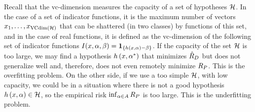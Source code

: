 Recall that the \acrshort{vc}-dimension measures the capacity of a set of hypotheses $\mathcal{H}$. 
In the case of a set of indicator functions, it is the maximum number of vectors $x_1, \ldots, x_{\operatorname{VCdim}\left(\mathcal{H}\right)}$ that can be shattered (in two classes) by functions of this set, and in the case of real functions, it is defined as the \acrshort{vc}-dimension of the following set of indicator functions $ I(x, \alpha, \beta) = \bm{1}_{\{h\left(x, \alpha\right) - \beta\}} $.
If the capacity of the set $\mathcal{H}$ is too large, we may find a
hypothesis $h\left(x, {\alpha}^*\right)$ that minimizes $\hat{R}_{D}$ but does not 
generalize well and, therefore, does not even remotely minimize $R_P$. This is the 
overfitting problem. 
On the other side, if we use a too simple $\mathcal{H}$, 
with low capacity, we could be in a situation where there is not a good hypothesis $h\left(x, \alpha\right) \in \mathcal{H}$, so the empirical risk $\inf_{\alpha \in A} R_P$ is too large. This is the underfitting problem.




